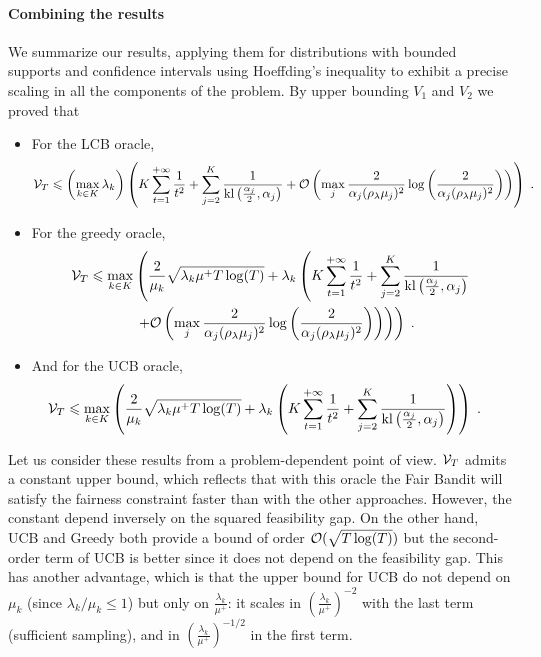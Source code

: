 \paragraph{Combining the results} We summarize our results, applying them for distributions with bounded supports and confidence intervals using Hoeffding's inequality to exhibit a precise scaling in all the components of the problem. By upper bounding $V_1$ and $V_2$ we proved that 

\begin{itemize}
	\item For the LCB oracle, 
	\[\mathcal{V}_T \leqslant \left(\max_{k \in K}\lambda_k\right) \left( K \sum_{t=1}^{+\infty} \frac{1}{t^2} + \sum_{j=2}^K\frac{1}{\text{\normalfont kl}\left(\frac{\alpha_j}{2}, \alpha_j\right)} + \mathcal{O}\left(\max_j\frac{2}{\alpha_j(\rho_\lambda \mu_j)^2}\log\left(\frac{2}{\alpha_j(\rho_\lambda \mu_j)^2}\right)\right)\right) \;. \]
	\item For the greedy oracle, 
	\begin{align*} \mathcal{V}_T \leqslant \max_{k\in K} &\left(\frac{2}{\mu_k}\sqrt{\lambda_k \mu^+ T \log(T)}+ \lambda_k\left(K \sum_{t=1}^{+\infty} \frac{1}{t^2} + \sum_{j=2}^K\frac{1}{\text{\normalfont kl}\left(\frac{\alpha_j}{2}, \alpha_j\right)} \right.\right. \\
	& \left.\left. + \mathcal{O}\left(\max_j\frac{2}{\alpha_j(\rho_\lambda \mu_j)^2}\log\left(\frac{2}{\alpha_j(\rho_\lambda \mu_j)^2}\right)\right)\right)\right) \;. \end{align*}
	\item And for the UCB oracle, 
		\begin{align*} \mathcal{V}_T \leqslant \max_{k\in K} &\left(\frac{2}{\mu_k}\sqrt{\lambda_k \mu^+ T \log(T)}+ \lambda_k\left(K \sum_{t=1}^{+\infty} \frac{1}{t^2} + \sum_{j=2}^K\frac{1}{\text{\normalfont kl}\left(\frac{\alpha_j}{2}, \alpha_j\right)}\right)\right) \;. \end{align*}
\end{itemize}

Let us consider these results from a problem-dependent point of view. $\mathcal{V}_T$ admits a constant upper bound, which reflects that with this oracle the Fair Bandit will satisfy the fairness constraint faster than with the other approaches. However, the constant depend inversely on the squared feasibility gap. On the other hand, UCB and Greedy both provide a bound of order $\mathcal{O}(\sqrt{T\log(T)})$ but the second-order term of UCB is better since it does not depend on the feasibility gap. This has another advantage, which is that the upper bound for UCB do not depend on $\mu_k$ (since $\lambda_k/\mu_k \leq 1$) but only on $\frac{\lambda_k}{\mu^+}$: it scales in $\left(\frac{\lambda_k}{\mu^+}\right)^{-2}$ with the last term (sufficient sampling), and in $\left(\frac{\lambda_k}{\mu^+}\right)^{-1/2}$ in the first term.

